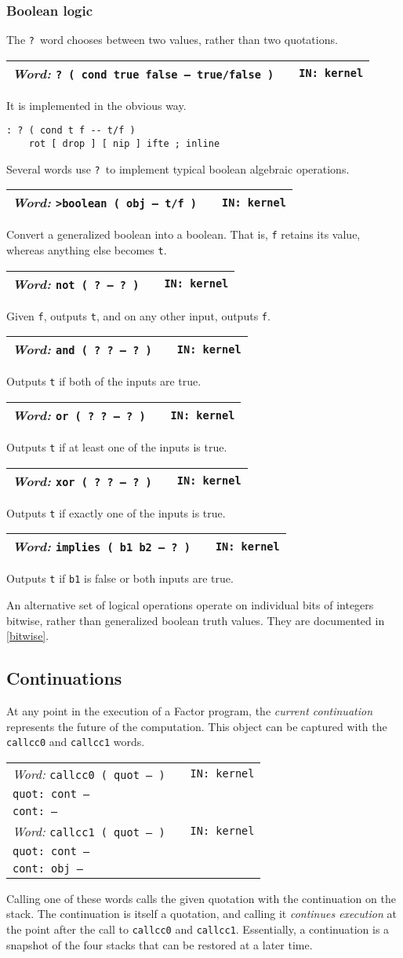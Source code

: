 \documentclass{report}
\newcommand{\ordinaryword}[3]{\index{#1}
\emph{Word:} \texttt{#2} &&\texttt{IN: #3}}
\newcommand{\wordtable}[1]{

\begin{tabularx}{12cm}[t]{lXr}
\hline
#1\\
\hline
\end{tabularx}

}
\begin{document}
\subsubsection{Boolean logic}

The \texttt{?}~word chooses between two values, rather than two quotations.
\wordtable{
\ordinaryword{?}{?~( cond true false -- true/false )}{kernel}
}
It is implemented in the obvious way.
\begin{verbatim}
: ? ( cond t f -- t/f )
    rot [ drop ] [ nip ] ifte ; inline
\end{verbatim}
Several words use \texttt{?}~to implement typical boolean algebraic operations.
\wordtable{
\ordinaryword{>boolean}{>boolean ( obj -- t/f )}{kernel}
}
Convert a generalized boolean into a boolean. That is, \texttt{f} retains its value, whereas anything else becomes \texttt{t}.
\wordtable{
\ordinaryword{not}{not ( ?~-- ?~)}{kernel}
}
Given \texttt{f}, outputs \texttt{t}, and on any other input, outputs \texttt{f}.
\wordtable{
\ordinaryword{and}{and ( ?~?~-- ?~)}{kernel}
}
Outputs \texttt{t} if both of the inputs are true.
\wordtable{
\ordinaryword{or}{or ( ?~?~-- ?~)}{kernel}
}
Outputs \texttt{t} if at least one of the inputs is true.
\wordtable{
\ordinaryword{xor}{xor ( ?~?~-- ?~)}{kernel}
}
Outputs \texttt{t} if exactly one of the inputs is true.
\wordtable{
\ordinaryword{implies}{implies ( b1~b2~-- ?~)}{kernel}
}
Outputs \texttt{t} if \texttt{b1} is false or both inputs are true.

An alternative set of logical operations operate on individual bits of integers bitwise, rather than generalized boolean truth values. They are documented in \ref{bitwise}.

\subsection{Continuations}

\newcommand{\contglos}{
}
\contglos
At any point in the execution of a Factor program, the \emph{current continuation} represents the future of the computation. This object can be captured with the \texttt{callcc0} and \texttt{callcc1} words.
\wordtable{
\ordinaryword{callcc0}{callcc0 ( quot -- )}{kernel}\\
\texttt{quot:~cont --}\\
\texttt{cont:~--}\\
\ordinaryword{callcc1}{callcc1 ( quot -- )}{kernel}\\
\texttt{quot:~cont --}\\
\texttt{cont:~obj --}
}
Calling one of these words calls the given quotation with the continuation on the stack. The continuation is itself a quotation, and calling it \emph{continues execution} at the point after the call to \texttt{callcc0} and \texttt{callcc1}. Essentially, a continuation is a snapshot of the four stacks that can be restored at a later time.
\end{document}
